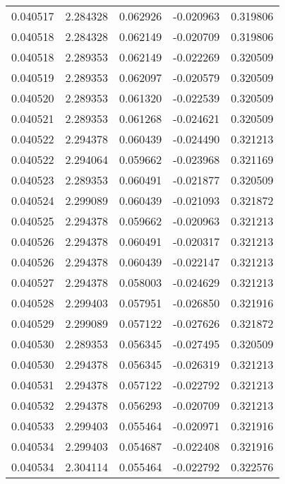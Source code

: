 \begin{tabular}{lrrrr}
0.040517    &  2.284328 &  0.062926 & -0.020963 &             0.319806 \\
0.040518    &  2.284328 &  0.062149 & -0.020709 &             0.319806 \\
0.040518    &  2.289353 &  0.062149 & -0.022269 &             0.320509 \\
0.040519    &  2.289353 &  0.062097 & -0.020579 &             0.320509 \\
0.040520    &  2.289353 &  0.061320 & -0.022539 &             0.320509 \\
0.040521    &  2.289353 &  0.061268 & -0.024621 &             0.320509 \\
0.040522    &  2.294378 &  0.060439 & -0.024490 &             0.321213 \\
0.040522    &  2.294064 &  0.059662 & -0.023968 &             0.321169 \\
0.040523    &  2.289353 &  0.060491 & -0.021877 &             0.320509 \\
0.040524    &  2.299089 &  0.060439 & -0.021093 &             0.321872 \\
0.040525    &  2.294378 &  0.059662 & -0.020963 &             0.321213 \\
0.040526    &  2.294378 &  0.060491 & -0.020317 &             0.321213 \\
0.040526    &  2.294378 &  0.060439 & -0.022147 &             0.321213 \\
0.040527    &  2.294378 &  0.058003 & -0.024629 &             0.321213 \\
0.040528    &  2.299403 &  0.057951 & -0.026850 &             0.321916 \\
0.040529    &  2.299089 &  0.057122 & -0.027626 &             0.321872 \\
0.040530    &  2.289353 &  0.056345 & -0.027495 &             0.320509 \\
0.040530    &  2.294378 &  0.056345 & -0.026319 &             0.321213 \\
0.040531    &  2.294378 &  0.057122 & -0.022792 &             0.321213 \\
0.040532    &  2.294378 &  0.056293 & -0.020709 &             0.321213 \\
0.040533    &  2.299403 &  0.055464 & -0.020971 &             0.321916 \\
0.040534    &  2.299403 &  0.054687 & -0.022408 &             0.321916 \\
0.040534    &  2.304114 &  0.055464 & -0.022792 &             0.322576 \\

\end{tabular}
